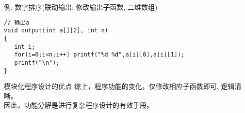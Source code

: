 \begin{frame}{例: 数字排序(联动输出: 修改输出子函数, 二维数组)}
\begin{lstlisting}
// 输出a
void output(int a[][2], int n)
{
   int i;
   for(i=0;i<n;i++) printf("%d %d",a[i][0],a[i][1]);
   printf("\n");
}
\end{lstlisting}

\begin{block}{模块化程序设计的优点}
	综上，程序功能的变化，仅修改相应子函数即可, 逻辑清晰。\\
	因此，功能分解是进行复杂程序设计的有效手段。
\end{block}
\end{frame}






